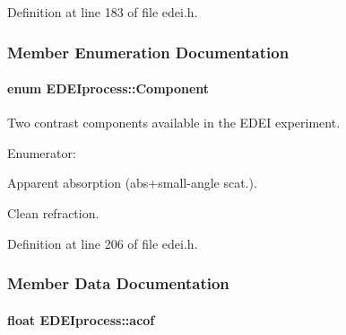Definition at line 183 of file edei.h.



\subsubsection{Member Enumeration Documentation}
\hypertarget{classEDEIprocess_a745d55d7f97f3aafa52998d49d9acde4}{
\paragraph[{Component}]{\setlength{\rightskip}{0pt plus 5cm}enum {\bf EDEIprocess::Component}}\hfill}
\label{classEDEIprocess_a745d55d7f97f3aafa52998d49d9acde4}


Two contrast components available in the EDEI experiment. 

\begin{Desc}
\item[Enumerator: ]\par
\begin{description}
\item[{\em 
\hypertarget{classEDEIprocess_a745d55d7f97f3aafa52998d49d9acde4a0ca15c00e66cb8d8eb71439dfad57bae}{
ABS}
\label{classEDEIprocess_a745d55d7f97f3aafa52998d49d9acde4a0ca15c00e66cb8d8eb71439dfad57bae}
}]Apparent absorption (abs+small-\/angle scat.). \item[{\em 
\hypertarget{classEDEIprocess_a745d55d7f97f3aafa52998d49d9acde4ab2db81707708c7fc95573b0ec104ae9f}{
REF}
\label{classEDEIprocess_a745d55d7f97f3aafa52998d49d9acde4ab2db81707708c7fc95573b0ec104ae9f}
}]Clean refraction. \end{description}
\end{Desc}



Definition at line 206 of file edei.h.



\subsubsection{Member Data Documentation}
\hypertarget{classEDEIprocess_a0ee7ea8bd15cc065be6bc4bb4a08c161}{
\paragraph[{acof}]{\setlength{\rightskip}{0pt plus 5cm}float {\bf EDEIprocess::acof}}\hfill}
\label{classEDEIprocess_a0ee7ea8bd15cc065be6bc4bb4a08c161}


